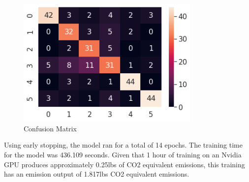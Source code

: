 \begin{figure}[H]
	\centering
	\includegraphics[width=0.8\textwidth]{images/q1/pa/matrix}
	\caption{Confusion Matrix}
	\label{fig:q1paMatrix}
\end{figure}

Using early stopping, the model ran for a total of 14 epochs. The training time
for the model was 436.109 seconds. Given that 1 hour of training on an Nvidia
GPU produces approximately 0.25lbs of CO2 equivalent emissions, this training
has an emission output of 1.817lbs CO2 equivalent emissions.
